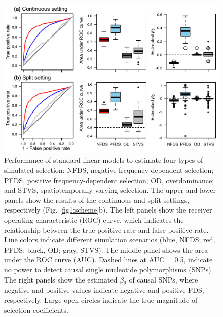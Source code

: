 \documentclass[12pt,]{article}
\begin{document}
\begin{figure}[]
  \includegraphics[width=\linewidth]{FigS5_beta2LMdomi.pdf}
  \caption{Performance of standard linear models to estimate four types of simulated selection: NFDS, negative frequency-dependent selection; PFDS, positive frequency-dependent selection; OD, overdominance; and STVS, spatiotemporally varying selection. The upper and lower panels show the results of the continuous and split settings, respectively (Fig. \ref{fig1:scheme}b). The left panels show the receiver operating characteristic (ROC) curve, which indicates the relationship between the true positive rate and false positive rate. Line colors indicate different simulation scenarios (blue, NFDS; red, PFDS; black, OD; gray, STVS). The middle panel shows the area under the ROC curve (AUC). Dashed lines at AUC = 0.5, indicate no power to detect causal single nucleotide polymorphisms (SNPs). The right panels show the estimated $\beta_2$ of causal SNPs, where negative and positive values indicate negative and positive FDS, respectively. Large open circles indicate the true magnitude of selection coefficients.}
  \label{figS5:beta2LM}
\end{figure}
\end{document}
